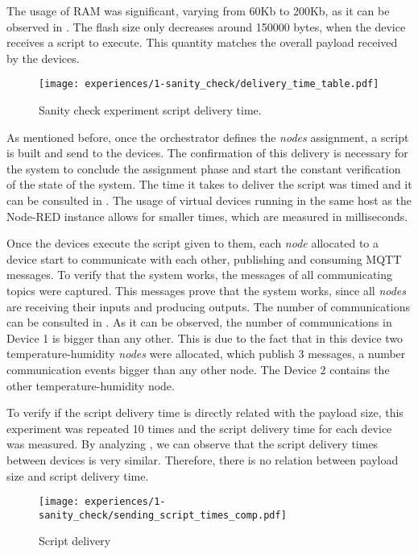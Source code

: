 The usage of RAM was significant, varying from 60Kb to 200Kb, as it can be observed in . The flash size only decreases around 150000 bytes, when the device receives a script to execute. This quantity matches the overall payload received by the devices.

\begin{figure}[h]
\centering
\texttt{[image: experiences/1-sanity\_check/delivery\_time\_table.pdf]}
\caption[Sanity check experiment script delivery time.]{Sanity check experiment script delivery time.}\label{fig:sanity_check_delivery_time}
\end{figure}

As mentioned before, once the orchestrator defines the \textit{nodes} assignment, a script is built and send to the devices. The confirmation of this delivery is necessary for the system to conclude the assignment phase and start the constant verification of the state of the system. The time it takes to deliver the script was timed and it can be consulted in . The usage of virtual devices running in the same host as the Node-RED instance allows for smaller times, which are measured in milliseconds.

Once the devices execute the script given to them, each \textit{node} allocated to a device start to communicate with each other, publishing and consuming MQTT messages. To verify that the system works, the messages of all communicating topics were captured. This messages prove that the system works, since all \textit{nodes} are receiving their inputs and producing outputs. The number of communications can be consulted in . As it can be observed, the number of communications in Device 1 is bigger than any other. This is due to the fact that in this device two temperature-humidity \textit{nodes} were allocated, which publish 3 messages, a number communication events bigger than any other node. The Device 2 contains the other temperature-humidity node.

To verify if the script delivery time is directly related with the payload size, this experiment was repeated 10 times and the script delivery time for each device was measured. By analyzing , we can observe that the script delivery times between devices is very similar. Therefore, there is no relation between payload size and script delivery time.

\begin{figure}[h]
\centering
\texttt{[image: experiences/1-sanity\_check/sending\_script\_times\_comp.pdf]}
\caption[Script delivery times]{Script delivery}\label{fig:delivery_times_comp}
\end{figure}

